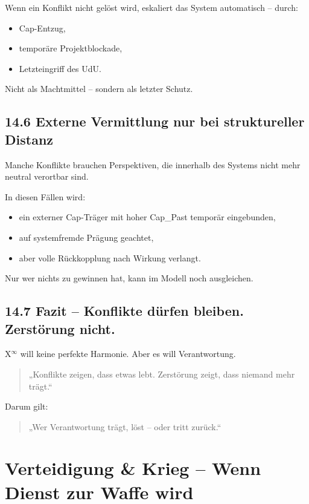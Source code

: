 \documentclass[12pt,a4paper]{book}
\begin{document}
Wenn ein Konflikt nicht gelöst wird,  
eskaliert das System automatisch – durch:

\begin{itemize}
    \item Cap-Entzug,
    \item temporäre Projektblockade,
    \item Letzteingriff des UdU.
\end{itemize}

Nicht als Machtmittel – sondern als letzter Schutz.

\section*{14.6 Externe Vermittlung nur bei struktureller Distanz}

Manche Konflikte brauchen Perspektiven,  
die innerhalb des Systems nicht mehr neutral verortbar sind.

In diesen Fällen wird:

\begin{itemize}
    \item ein externer Cap-Träger mit hoher Cap\_Past temporär eingebunden,
    \item auf systemfremde Prägung geachtet,
    \item aber volle Rückkopplung nach Wirkung verlangt.
\end{itemize}

Nur wer nichts zu gewinnen hat,  
kann im Modell noch ausgleichen.

\section*{14.7 Fazit – Konflikte dürfen bleiben. Zerstörung nicht.}

X$^\infty$ will keine perfekte Harmonie.  
Aber es will Verantwortung.

\begin{quote}
„Konflikte zeigen, dass etwas lebt.  
Zerstörung zeigt, dass niemand mehr trägt.“  
\end{quote}

Darum gilt:

\begin{quote}
„Wer Verantwortung trägt, löst –  
oder tritt zurück.“  
\end{quote}

\chapter{Verteidigung \& Krieg – Wenn Dienst zur Waffe wird}
\end{document}
